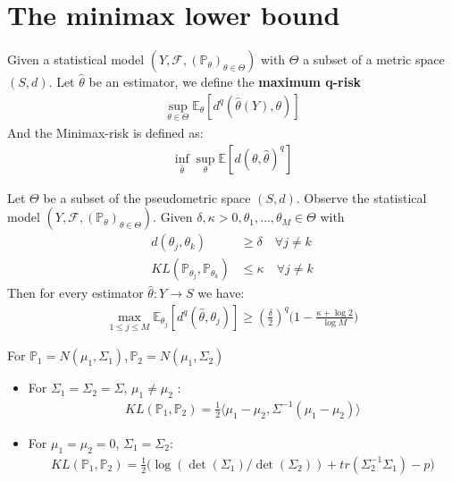 \section{The minimax lower bound}
\begin{definition}
Given a statistical model $(Y, \mathcal{F}, (\mathbb{P}_\theta)_{\theta\in \Theta})$ with $\Theta$ a subset of a metric space $(S, d)$. Let $\hat{\theta}$ be an estimator, we define the \textbf{maximum q-risk}
\begin{align*}
	\sup_{\theta \in \Theta} \mathbb{E}_\theta[ d^q(\hat{\theta}(Y), \theta)]
\end{align*}
And the Minimax-risk is defined as:
\begin{align*}
	\inf_{\hat{\theta}} \sup_\theta \mathbb{E}[d(\theta, \hat{\theta})^q]
\end{align*}
\end{definition}

\begin{theorem}
	Let $\Theta$ be a subset of the pseudometric space $(S, d)$. Observe the statistical model $(Y, \mathcal{F}, (\mathbb{P}_\theta)_{\theta \in \Theta})$. Given $\delta, \kappa > 0, \theta_1, \dots, \theta_M \in \Theta$ with
	\begin{align*}
		d(\theta_j, \theta_k) &\ge \delta \quad \forall j\neq k\\
		KL(\mathbb{P}_{\theta_j}, \mathbb{P}_{\theta_k}) &\le \kappa \quad \forall j\neq k
	\end{align*}
	Then for every estimator $\hat{\theta}: Y \rightarrow S$ we have:
	\begin{align*}
		\max_{1 \le j \le M} \mathbb{E}_{\theta_j}[d^q(\hat{\theta}, \theta_j)] \ge (\frac{\delta}{2})^q \bigg(1 - \frac{\kappa + \log 2}{\log M}\bigg)
	\end{align*}
\end{theorem}

\begin{example}
For $\mathbb{P}_1 = N(\mu_1, \Sigma_1), \mathbb{P}_2 = N(\mu_1, \Sigma_2)$
\begin{itemize}
	\item For $\Sigma_1 = \Sigma_2 = \Sigma$, $\mu_1 \neq \mu_2$ :
\begin{align*}
	KL(\mathbb{P}_1, \mathbb{P}_2) = \frac{1}{2}\langle \mu_1 - \mu_2, \Sigma^{-1} (\mu_1 - \mu_2)\rangle
\end{align*}
\item For $\mu_1 = \mu_2 = 0$, $\Sigma_1 = \Sigma_2$:
\begin{align*}
	KL( \mathbb{P}_1, \mathbb{P}_2) = \frac{1}{2}\bigg(\log(\det(\Sigma_1) \slash \det( \Sigma_2)) + tr(\Sigma_2^{-1} \Sigma_1) - p \bigg)
\end{align*}
\end{itemize}
	
\end{example}


